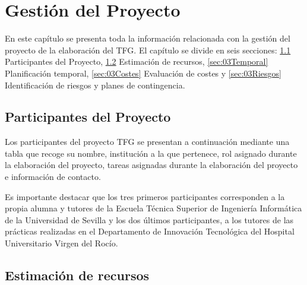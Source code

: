 \chapter{Gestión del Proyecto}\label{cap:03gestión}

En este capítulo se presenta toda la información relacionada con la gestión del proyecto de la elaboración del TFG. El capítulo se divide en seis secciones: \ref{sec:03Participantes} Participantes del Proyecto, %
\ref{sec:03Recursos} Estimación de recursos, \ref{sec:03Temporal} Planificación temporal, \ref{sec:03Costes} Evaluación de costes y \ref{sec:03Riesgos} Identificación de riesgos y planes de contingencia.

\section{Participantes del Proyecto} \label{sec:03Participantes}

Los participantes del proyecto TFG se presentan a continuación mediante una tabla que recoge su nombre, institución a la que pertenece, rol asignado durante la elaboración del proyecto, tareas asignadas durante la elaboración del proyecto e información de contacto. 

Es importante destacar que los tres primeros participantes corresponden a la propia alumna y tutores de la Escuela Técnica Superior de Ingeniería Informática de la Universidad de Sevilla y los dos últimos participantes, a los tutores de las prácticas realizadas en el Departamento de Innovación Tecnológica del Hospital Universitario Virgen del Rocío.












\section{Estimación de recursos} \label{sec:03Recursos}

